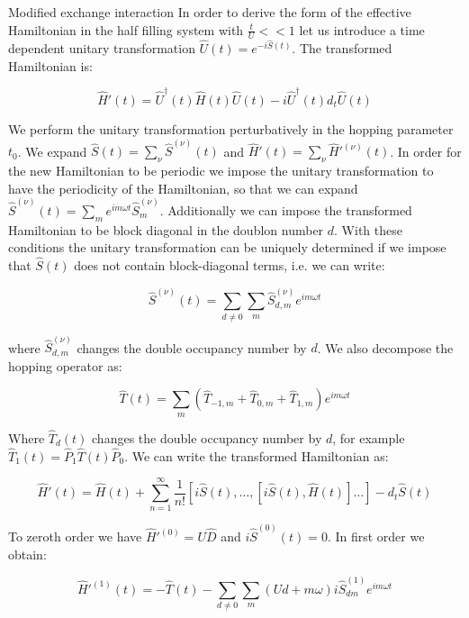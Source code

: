 \begin{section}{Modified exchange interaction}
In order to derive the form of the effective Hamiltonian in the half filling system with $\frac{t}{U} << 1$ let us introduce a time dependent unitary transformation $\hat{U}(t) = e^{-i\hat{S}(t)}$. The transformed Hamiltonian is:

\begin{equation}
\hat{H}'(t) = \hat{U}^\dagger (t) \hat{H}(t) \hat{U}(t) - i\hat{U}^\dagger(t) d_t \hat{U}(t)
\end{equation} 

We perform the unitary transformation perturbatively in the hopping parameter $t_0$. We expand $\hat{S}(t) = \sum_\nu \hat{S}^{(\nu)}(t)$ and $\hat{H}'(t) = \sum_\nu \hat{H}'^{(\nu)}(t)$. In order for the new Hamiltonian to be periodic we impose the unitary transformation to have the periodicity of the Hamiltonian, so that we can expand $\hat{S}^{(\nu)}(t) = \sum_m e^{im\omega t}\hat{S}^{(\nu)}_m$. Additionally we can impose the transformed Hamiltonian to be block diagonal in the doublon number $d$. With these conditions the unitary transformation can be uniquely determined if we impose that $\hat{S}(t)$ does not contain block-diagonal terms, i.e. we can write:

\begin{equation}
\hat{S}^{(\nu)}(t) = \sum_{d \neq 0} \sum_m \hat{S}^{(\nu)}_{d,m} e^{im\omega t}
\end{equation}

where $\hat{S}^{(\nu)}_{d,m}$ changes the double occupancy number by $d$. We also decompose the hopping operator as:

\begin{equation}
\hat{T}(t) = \sum_m (\hat{T}_{-1,m}+\hat{T}_{0,m}+\hat{T}_{1,m})e^{im\omega t}
\end{equation}

Where $\hat{T}_d(t)$ changes the double occupancy number by $d$, for example $\hat{T}_1(t) = \hat{P}_1 \hat{T}(t) \hat{P}_0$. We can write the transformed Hamiltonian as:

\begin{equation}
\label{Perturbation}
\hat{H}'(t) = \hat{H}(t) + \sum_{n=1}^\infty \frac{1}{n!} \left[i\hat{S}(t), \dots, \left[ i\hat{S}(t), \hat{H}(t) \right]\dots \right] - d_t \hat{S}(t)
\end{equation}

To zeroth order we have $\hat{H}'^{(0)}= U\hat{D}$ and $i\hat{S}^{(0)}(t)=0$. In first order we obtain:

\begin{equation}
\hat{H}'^{(1)}(t)=-\hat{T}(t)-\sum_{d\neq 0}\sum_m (Ud+m\omega) i\hat{S}^{(1)}_{dm} e^{im\omega t}
\end{equation}


\end{section}
